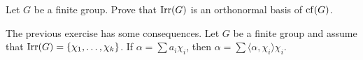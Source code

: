 \begin{exercise}
    Let $G$ be a finite group. 
    Prove that $\operatorname{Irr}(G)$ is an orthonormal basis of $\operatorname{cf}(G)$. 
\end{exercise}

The previous exercise has some consequences. Let $G$ be a finite group
and assume that $\operatorname{Irr}(G)=\{\chi_1,\dots,\chi_k\}$. If 
$\alpha=\sum a_i\chi_i$, then $\alpha=\sum\langle\alpha,\chi_i\rangle\chi_i$.  